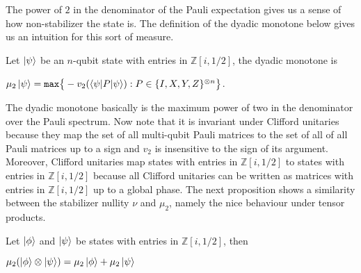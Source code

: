 \documentclass[12pt]{dalthesis}
\begin{document}
The power of $2$ in the denominator of the Pauli expectation gives us a sense of how non-stabilizer the state is. The definition of the dyadic monotone below gives us an intuition for this sort of measure. 
\begin{comment}
Firstly, let $q$ be a non-zero rational number. It can be written as a product of integer powers of prime numbers in a unique way:
\begin{center}
$q = \pm 2^k \cdot p_1^{k(1)} \cdots p_m^{k(m)}$, $p_k$ are odd primes, and $k, k(1), \dots , k(m)$ are integers
\end{center}

Let us define $v_2 (q)$ to be $k$. Note that function $v_2$ is somewhat similar to log$|\cdot|$ in that $v_2(q_1q_2) = v_2(q_1) + v_2(q_2), v_2(\pm 1) = 0$ and $v_2 (q) = v_2 (-q)$. For odd integer $a$ and integer $k$ the value is $v_2 (a/2^k) = - k$. Note also that $v_2$ is always non-negative for integer arguments. It is convenient to extend $v_2$ to all rational numbers, by defining $v_2(0) = + \infty $ (and note that the multiplicative property still holds).
\end{comment}

\begin{definition}
Let $\ket{\psi}$ be an $n$-qubit state with entries in $\mathbb{Z}[i, 1/2]$, the dyadic monotone is 
\begin{center}
$\mu_2 \ket{\psi} = \texttt{max} \big\{-v_2(\braket{\psi | P | \psi}): P \in \{I, X, Y, Z \}^{\otimes n} \big\}$.
\end{center}
\end{definition}
The dyadic monotone basically is the maximum power of two in the denominator over the Pauli spectrum. Now note that it is invariant under Clifford unitaries because they map the set of all multi-qubit Pauli matrices to the set of all of all Pauli matrices up to a sign and $v_2$ is insensitive to the sign of its argument. Moreover, Clifford unitaries map states with entries in $\mathbb{Z}[i, 1/2]$ to states with entries in $\mathbb{Z}[i, 1/2]$ because all Clifford unitaries can be written as matrices with entries in $\mathbb{Z}[i, 1/2]$ up to a global phase. The next proposition shows a similarity between the stabilizer nullity $\nu$ and $\mu_2$, namely the nice behaviour under tensor products.

\begin{proposition}
Let $\ket{\phi}$ and $\ket{\psi}$ be states with entries in $\mathbb{Z}[i, 1/2]$, then 
\begin{center}
$\mu_2 (\ket{\phi} \otimes \ket{\psi}) = \mu_2 \ket{\phi} + \mu_2 \ket{\psi}$
\end{center}
\end{proposition}
\end{document}
